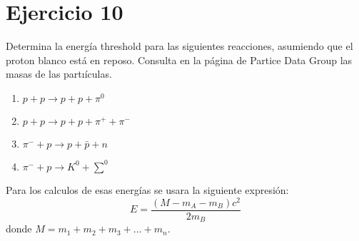 \section*{Ejercicio 10}
Determina la energía threshold para las siguientes reacciones, asumiendo que el proton blanco está
en reposo. Consulta en la página de Partice Data Group las masas de las partıículas.
\begin{enumerate}
    \item $p+p \rightarrow p+p+\pi^0$
    \item $p+p \rightarrow p+p+\pi^++\pi^-$
    \item $\pi^-+p \rightarrow p+\bar{p}+n$
    \item $\pi^-+p \rightarrow K^0+\sum^0$
\end{enumerate}
Para los calculos de esas energías se usara la siguiente expresión:
\begin{equation*}
    E=\frac{(M-m_A-m_B)c^2}{2m_B}
\end{equation*}
donde $M=m_1+m_2+m_3+...+m_n$.
